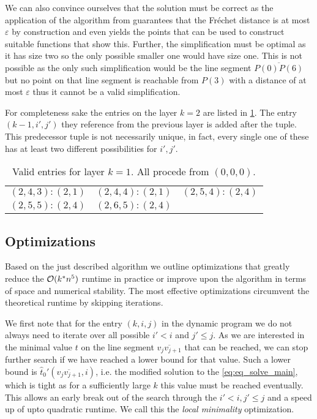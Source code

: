 We can also convince ourselves that the solution must be correct as the application of the algorithm from \citeauthor{computing_the_frechet_distance_between_two_polygonal_curves} guarantees that the Fréchet distance is at most \(\varepsilon\) by construction and even yields the points that can be used to construct suitable functions that show this. Further, the simplification must be optimal as it has size two so the only possible smaller one would have size one. This is not possible as the only such simplification would be the line segment \(\overline{P(0)P(6)}\) but no point on that line segment is reachable from \(P(3)\) with a distance of at most \(\varepsilon\) thus it cannot be a valid simplification.

For completeness sake the entries on the layer \(k = 2\) are listed in \cref{tab:exlayer2}. The entry \((k - 1, i', j')\) they reference from the previous layer is added after the tuple. This predecessor tuple is not necessarily unique, in fact, every single one of these has at least two different possibilities for \(i', j'\).
\begin{table}[ht]
\centering
\begin{tabular}{|ccc|}
\hline
$(2,4,3):(2, 1)$ & $(2,4,4):(2, 1)$ & $(2,5,4):(2,4)$ \\
$(2,5,5):(2,4)$ & $(2,6,5):(2,4)$ & \\
\hline
\end{tabular}
\caption{Valid entries for layer \(k = 1\). All procede from \((0,0,0)\).}
\label{tab:exlayer2}
\end{table}

\subsection{Optimizations}
\label{ssec:optimizations}
Based on the just described algorithm we outline optimizations that greatly reduce the \(\mathcal{O}(k^*n^5)\) runtime in practice or improve upon the algorithm in terms of space and numerical stability. The most effective optimizations circumvent the theoretical runtime by skipping iterations. 

We first note that for the entry \((k, i, j)\) in the dynamic program we do not always need to iterate over all possible \(i' < i\) and \(j' \leq j\). As we are interested in the minimal value \(t\) on the line segment \(\overline{v_{j}v_{j+1}}\) that can be reached, we can stop further search if we have reached a lower bound for that value. Such a lower bound is \(\hat t_0'(\overline{v_{j}v_{j+1}}, i)\), i.e. the modified solution to the \cref{eq:eq_solve_main}, which is tight as for a sufficiently large \(k\) this value must be reached eventually. This allows an early break out of the search through the \(i' < i, j'\leq j\) and a speed up of upto quadratic runtime. We call this the \emph{local minimality} optimization. 

